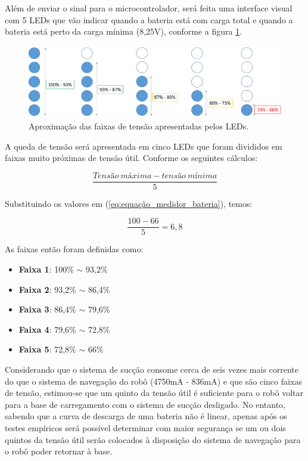 		Além de enviar o sinal para o microcontrolador, será feita uma interface visual com 5 LEDs que vão indicar quando a bateria está com carga total e quando a bateria está perto da carga mínima (8,25V), conforme a figura \ref{img:faixa_de_tensão}.

		\begin{figure}[H]
			\centering
			\includegraphics[scale=0.3]{figuras/LEDs.png}
			\caption{Aproximação das faixas de tensão apresentadas pelos LEDs.}
			\label{img:faixa_de_tensão}
		\end{figure}

		A queda de tensão será apresentada em cinco LEDs que foram divididos em faixas muito próximas de tensão útil. Conforme os seguintes cálculos:

		\begin{equation}
		\label{eq:equação_medidor_bateria}
			\frac{Tensão\ máxima - tensão\ mínima}{5}  
		\end{equation}

		Substituindo os valores em (\ref{eq:equação_medidor_bateria}), temos:

		\begin{equation}
		\label{eq:equação_medidor_bateria_2}
			\frac{100-66}{5} = 6,8  
		\end{equation}

		As faixas então foram definidas como:

		\begin{itemize}
			\item \textbf{Faixa 1}: 100\% $\sim$ 93,2\%
			\item \textbf{Faixa 2}: 93,2\% $\sim$ 86,4\%
			\item \textbf{Faixa 3}: 86,4\% $\sim$ 79,6\%
			\item \textbf{Faixa 4}: 79,6\% $\sim$ 72,8\%
			\item \textbf{Faixa 5}: 72,8\% $\sim$ 66\%
		\end{itemize}
		
		Considerando que o sistema de sucção consome cerca de seis vezes mais corrente do que o sistema de navegação do robô (4750mA - 836mA) e que são cinco faixas de tensão, estimou-se que um quinto da tensão útil é suficiente para o robô voltar para a base de carregamento com o sistema de sucção desligado. No entanto, sabendo que a curva de descarga de uma bateria não é linear, apenas após os testes empíricos será possível determinar com maior segurança se um ou dois quintos da tensão útil serão colocados à disposição do sistema de navegação para o robô poder retornar à base. 

